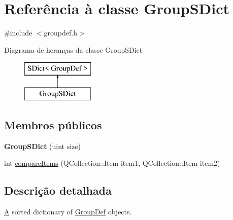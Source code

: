 \hypertarget{class_group_s_dict}{\section{Referência à classe Group\-S\-Dict}
\label{class_group_s_dict}
}


{\ttfamily \#include $<$groupdef.\-h$>$}

Diagrama de heranças da classe Group\-S\-Dict\begin{figure}[H]
\begin{center}
\leavevmode
\includegraphics[height=2.000000cm]{class_group_s_dict}
\end{center}
\end{figure}
\subsection*{Membros públicos}
\begin{DoxyCompactItemize}
\item 
\hypertarget{class_group_s_dict_aba4a0c29d675c77f4e1c94465f3062bc}{{\bfseries Group\-S\-Dict} (uint size)}\label{class_group_s_dict_aba4a0c29d675c77f4e1c94465f3062bc}

\item 
int \hyperlink{class_group_s_dict_a219450accf048597ffc7113ecde4c402}{compare\-Items} (Q\-Collection\-::\-Item item1, Q\-Collection\-::\-Item item2)
\end{DoxyCompactItemize}


\subsection{Descrição detalhada}
\hyperlink{class_a}{A} sorted dictionary of \hyperlink{class_group_def}{Group\-Def} objects. 

